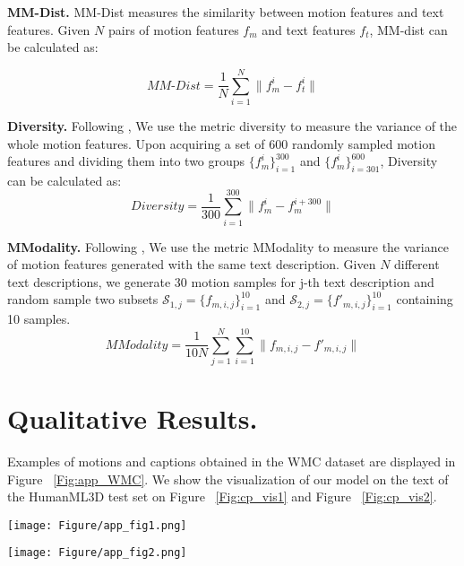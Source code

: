 \documentclass[letterpaper]{article} \usepackage{aaai24}
\begin{document}
\noindent\textbf{MM-Dist.} MM-Dist measures the similarity between motion features and text features. Given $N$ pairs of motion features $f_m$ and text features $f_t$, MM-dist can be calculated as:

\begin{equation}
    \textit{MM-Dist} = \frac{1}{N} \sum_{i=1}^{N}  \|f_m^i - f_t^i\|
\end{equation}

\noindent\textbf{Diversity.} Following \cite{guo2022generating}, We use the metric diversity to measure the variance of the whole motion features. Upon acquiring a set of 600 randomly sampled motion features and dividing them into two groups $\{f_m^i\}_{i=1}^{300}$ and $\{f_m^i\}_{i=301}^{600}$, Diversity can be calculated as:
\begin{equation}
    \textit{Diversity} = \frac{1}{300} \sum_{i=1}^{300}  \|f_m^i - f_m^{i+300}\|
\end{equation}


\noindent\textbf{MModality.} Following \cite{guo2022generating}, We use the metric MModality to measure the variance of motion features generated with the same text description. Given $N$ different text descriptions, we generate 30 motion samples for j-th text description and random sample two subsets $\mathcal{S}_{1,j}=\{f_{m,i,j}\}_{i=1}^{10}$ and $\mathcal{S}_{2,j}=\{f'_{m,i,j}\}_{i=1}^{10}$ containing 10 samples.
\begin{equation}
    \textit{MModality} = \frac{1}{10N} \sum_{j=1}^{N} \sum_{i=1}^{10}  \|f_{m,i,j} - f'_{m,i,j}\|
\end{equation}

\section{Qualitative Results.} Examples of motions and captions obtained in the WMC dataset are displayed in Figure ~\ref{Fig:app_WMC}. We show the visualization of our model on the text of the HumanML3D test set on Figure ~\ref{Fig:cp_vis1} and Figure ~\ref{Fig:cp_vis2}. 


\begin{figure*}[t] 
	\centering 
	\texttt{[image: Figure/app\_fig1.png]} 
	\caption{More examples of visualizations of the generated results of our model with classifier-free scale $(s=2)$. The text of the motion descriptions is taken from the Humanml3d test set. we mark the actions that appear in the sentences in red, and the descriptions of the actions in blue.}
	\label{Fig:cp_vis1} 
\end{figure*}
\begin{figure*}[t] 
	\centering 
	\texttt{[image: Figure/app\_fig2.png]} 
\caption{More examples of visualizations of the generated results of our model with classifier-free scale $(s=2)$. The text of the motion descriptions is taken from the Humanml3d test set. we mark the actions that appear in the sentences in red, and the descriptions of the actions in blue.}
	\label{Fig:cp_vis2} 
\end{figure*}





 
\end{document}
